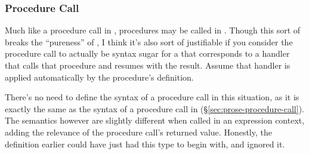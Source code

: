 \subsubsection{Procedure Call}

Much like a procedure call in \Prose{}, procedures may be called in \Poetry{}.
Though this sort of breaks the ``pureness'' of \Poetry{}, I think it's also
sort of justifiable if you consider the procedure call to actually be syntax
sugar for a  that corresponds to a handler that calls that procedure
and resumes with the result. Assume that handler is applied automatically by
the procedure's definition.

There's no need to define the syntax of a procedure call in this situation,
as it is exactly the same as the syntax of a procedure call in \Prose{}
(\S\ref{sec:prose-procedure-call}). The semantics however are slightly
different when called in an expression context, adding the relevance of
the procedure call's returned value. Honestly, the definition earlier
could have just had this type to begin with, and ignored it.

\begin{prooftree}
\end{prooftree}
